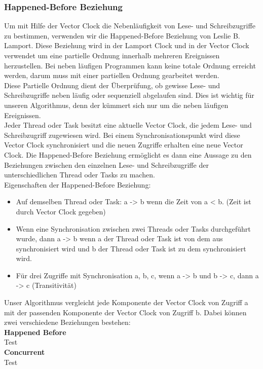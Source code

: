 \documentclass[10pt,a4paper]{article}
\begin{document}
\subsubsection{Happened-Before Beziehung}
\begin{flushleft}
Um mit Hilfe der Vector Clock die Nebenläufigkeit von Lese- und Schreibzugriffe zu bestimmen, verwenden wir die Happened-Before Beziehung von Leslie B. Lamport. Diese Beziehung wird in der Lamport Clock und in der Vector Clock verwendet um eine partielle Ordnung innerhalb mehreren Ereignissen herzustellen. Bei neben läufigen Programmen kann keine totale Ordnung erreicht werden, darum muss mit einer partiellen Ordnung gearbeitet werden.\\
Diese Partielle Ordnung dient der Überprüfung, ob gewisse Lese- und Schreibzugriffe neben läufig oder sequenziell abgelaufen sind. Dies ist wichtig für unseren Algorithmus, denn der kümmert sich nur um die neben läufigen Ereignissen.\\
Jeder Thread oder Task besitzt eine aktuelle Vector Clock, die jedem Lese- und Schreibzugriff zugewiesen wird. Bei einem Synchronisationspunkt wird diese Vector Clock synchronisiert und die neuen Zugriffe erhalten eine neue Vector Clock. Die Happened-Before Beziehung ermöglicht es dann eine Aussage zu den Beziehungen zwischen den einzelnen Lese- und Schreibzugriffe der unterschiedlichen Thread oder Tasks zu machen.\\[0.5cm]
Eigenschaften der Happened-Before Beziehung:
\begin{itemize}
\item Auf demselben Thread oder Task: a -> b wenn die Zeit von a < b. (Zeit ist durch Vector Clock gegeben)
\item Wenn eine Synchronisation zwischen zwei Threads oder Tasks durchgeführt wurde, dann a -> b wenn a der Thread oder Task ist von dem aus synchronisiert wird und b der Thread oder Task ist zu dem synchronisiert wird.
\item Für drei Zugriffe mit Synchronisation a, b, c, wenn a -> b und b -> c, dann a -> c (Transitivität)
\end{itemize}
Unser Algorithmus vergleicht jede Komponente der Vector Clock von Zugriff a mit der passenden Komponente der Vector Clock von Zugriff b. Dabei können zwei verschiedene Beziehungen bestehen:\\[0.5cm]
\textbf{{\large Happened Before}}\\
Test
\\[0.5cm]
\textbf{{\large Concurrent}}\\
Test
\end{flushleft}
\end{document}
